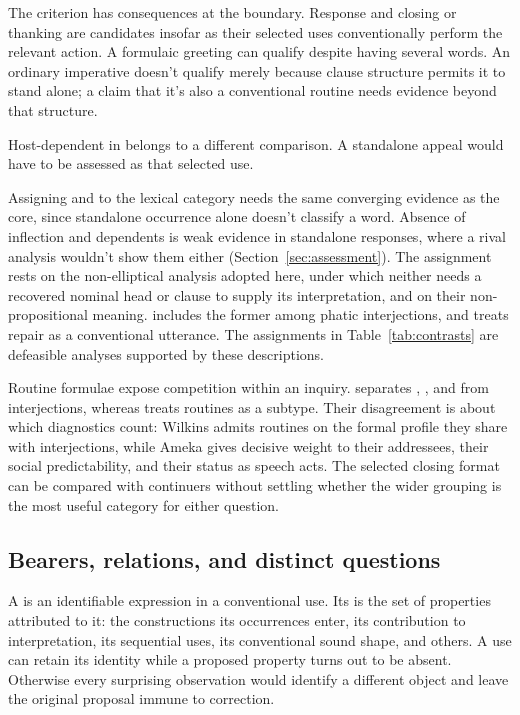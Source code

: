 \documentclass[12pt]{article}
\begin{document}
The criterion has consequences at the boundary. Response 
and closing or thanking  are candidates insofar as their
selected uses conventionally perform the relevant action. A formulaic
greeting  can qualify despite having several words.
An ordinary imperative  doesn't qualify merely because
clause structure permits it to stand alone; a claim that it's also a
conventional routine needs evidence beyond that structure.

Host-dependent  in  belongs to
a different comparison. A standalone appeal  would have
to be assessed as that selected use.

Assigning  and  to the lexical category
needs the same converging evidence as the core, since standalone occurrence
alone doesn't classify a word. Absence of inflection and dependents is weak
evidence in standalone responses, where a rival analysis wouldn't show them
either (Section~\ref{sec:assessment}). The assignment rests on the
non-elliptical analysis adopted here, under which neither needs a recovered
nominal head or clause to supply its interpretation, and on their
non-propositional meaning. \textcite[114]{ameka1992}
includes the former among phatic interjections, and
\textcite[152]{wilkins1992} treats repair  as a conventional
utterance. The assignments in Table~\ref{tab:contrasts} are defeasible
analyses supported by these descriptions.

Routine formulae expose competition within an inquiry.
\textcite[108--110]{ameka1992} separates , ,
and  from interjections, whereas
\textcite[142]{wilkins1992} treats routines as a subtype. Their
disagreement is about which diagnostics count: Wilkins admits routines on
the formal profile they share with interjections, while Ameka gives
decisive weight to their addressees, their social predictability, and their
status as speech acts. The selected closing format can be
compared with continuers without settling whether the wider grouping
is the most useful category for either question.

\subsection{Bearers, relations, and distinct questions}

A  is an identifiable expression in a conventional use.
Its  is the set of properties attributed to it: the
constructions its occurrences enter, its contribution to interpretation,
its sequential uses, its conventional sound shape, and others. A use can retain its identity
while a proposed property turns out to be absent. Otherwise every
surprising observation would identify a different object and leave the
original proposal immune to correction.
\end{document}

